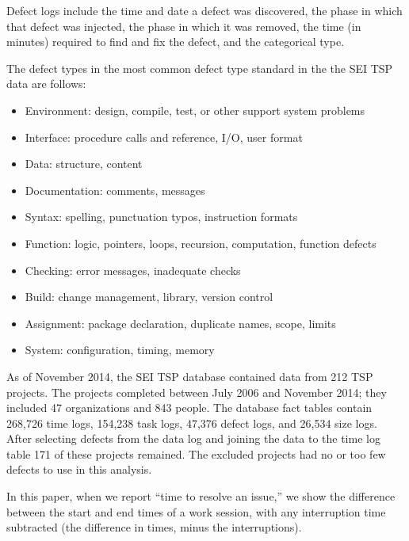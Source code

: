  Defect logs include the time and date a defect was discovered, the phase in which that defect was injected, the phase in which it was removed, the time (in minutes) required to find and fix the defect, and the categorical type.

The defect types in the most common defect type standard  in the the SEI TSP data are follows:
\begin{itemize}
\item Environment: design, compile, test, or other support system problems
\item Interface: procedure calls and reference, I/O, user format
\item Data: structure, content
\item Documentation: comments, messages
\item Syntax: spelling, punctuation typos, instruction formats
\item Function: logic, pointers, loops, recursion, computation, function defects  
\item Checking: error messages, inadequate checks
\item Build: change management, library, version control
\item Assignment: package
declaration, duplicate names, scope, limits
\item System: configuration, timing, memory
\end{itemize}


As of November 2014, the SEI TSP database contained data from 212
TSP projects. The projects completed between July 2006 and
November 2014; they included 47 organizations and 843 people. 
The database fact tables
contain 268,726 time logs, 
154,238 task logs,
 47,376 defect logs, 
and 26,534 size logs. 
After selecting defects from the data log and joining the data to the time log table  171 of these projects remained. The excluded projects had no or too few defects to use in this analysis.
 
In this paper, when we report ``time to resolve an
issue,'' we show the difference between the start and end times
of a work session, with any interruption time subtracted (the
difference in times, minus the interruptions). 


%
 
